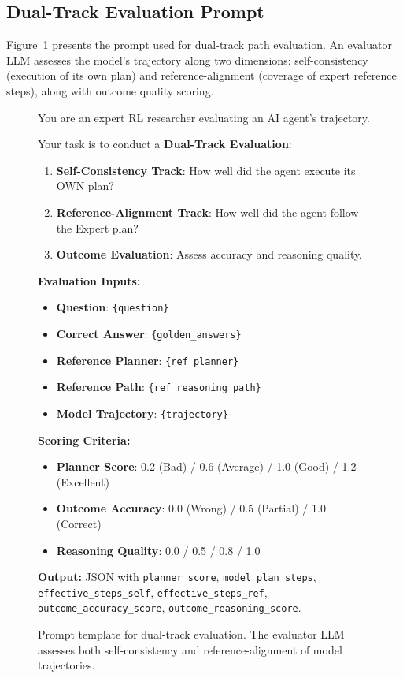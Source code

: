 \documentclass[11pt]{article}
\begin{document}
\subsection{Dual-Track Evaluation Prompt}
\label{sec:appendix_eval_prompt}

Figure~\ref{fig:prompt_eval} presents the prompt used for dual-track path evaluation. An evaluator LLM assesses the model's trajectory along two dimensions: self-consistency (execution of its own plan) and reference-alignment (coverage of expert reference steps), along with outcome quality scoring.

\begin{figure}[t]
\centering
\begin{tcolorbox}[colback=green!3, colframe=green!40, title=\textbf{Dual-Track Evaluation Prompt}, fonttitle=\bfseries, boxrule=0.5pt, left=3mm, right=3mm, top=2mm, bottom=2mm]
You are an expert RL researcher evaluating an AI agent's trajectory.

Your task is to conduct a \textbf{Dual-Track Evaluation}:
\begin{enumerate}[leftmargin=*, nosep]
\item \textbf{Self-Consistency Track}: How well did the agent execute its OWN plan?
\item \textbf{Reference-Alignment Track}: How well did the agent follow the Expert plan?
\item \textbf{Outcome Evaluation}: Assess accuracy and reasoning quality.
\end{enumerate}

\textbf{Evaluation Inputs:}
\begin{itemize}[leftmargin=*, nosep]
\item \textbf{Question}: \texttt{\{question\}}
\item \textbf{Correct Answer}: \texttt{\{golden\_answers\}}
\item \textbf{Reference Planner}: \texttt{\{ref\_planner\}}
\item \textbf{Reference Path}: \texttt{\{ref\_reasoning\_path\}}
\item \textbf{Model Trajectory}: \texttt{\{trajectory\}}
\end{itemize}

\textbf{Scoring Criteria:}
\begin{itemize}[leftmargin=*, nosep]
\item \textbf{Planner Score}: 0.2 (Bad) / 0.6 (Average) / 1.0 (Good) / 1.2 (Excellent)
\item \textbf{Outcome Accuracy}: 0.0 (Wrong) / 0.5 (Partial) / 1.0 (Correct)
\item \textbf{Reasoning Quality}: 0.0 / 0.5 / 0.8 / 1.0
\end{itemize}

\textbf{Output:} JSON with \texttt{planner\_score}, \texttt{model\_plan\_steps}, \texttt{effective\_steps\_self}, \texttt{effective\_steps\_ref}, \texttt{outcome\_accuracy\_score}, \texttt{outcome\_reasoning\_score}.
\end{tcolorbox}
\caption{Prompt template for dual-track evaluation. The evaluator LLM assesses both self-consistency and reference-alignment of model trajectories.}
\label{fig:prompt_eval}
\end{figure}
\end{document}
